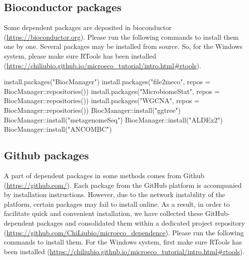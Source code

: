 \documentclass[
]{book}
\newenvironment{Shaded}{\begin{snugshade}}{\end{snugshade}}
\newcommand{\AttributeTok}[1]{\textcolor[rgb]{0.77,0.63,0.00}{#1}}
\newcommand{\FunctionTok}[1]{\textcolor[rgb]{0.00,0.00,0.00}{#1}}
\newcommand{\NormalTok}[1]{#1}
\newcommand{\SpecialCharTok}[1]{\textcolor[rgb]{0.00,0.00,0.00}{#1}}
\newcommand{\StringTok}[1]{\textcolor[rgb]{0.31,0.60,0.02}{#1}}
\begin{document}
\hypertarget{bioconductor-packages}{%
\subsection{Bioconductor packages}\label{bioconductor-packages}}

Some dependent packages are deposited in bioconductor (\url{https://bioconductor.org}).
Please run the following commands to install them one by one.
Several packages may be installed from source.
So, for the Windows system, please make sure RTools has been installed (\url{https://chiliubio.github.io/microeco_tutorial/intro.html\#rtools}).

\begin{Shaded}
\begin{Highlighting}[]
\FunctionTok{install.packages}\NormalTok{(}\StringTok{"BiocManager"}\NormalTok{)}
\FunctionTok{install.packages}\NormalTok{(}\StringTok{"file2meco"}\NormalTok{, }\AttributeTok{repos =}\NormalTok{ BiocManager}\SpecialCharTok{::}\FunctionTok{repositories}\NormalTok{())}
\FunctionTok{install.packages}\NormalTok{(}\StringTok{"MicrobiomeStat"}\NormalTok{, }\AttributeTok{repos =}\NormalTok{ BiocManager}\SpecialCharTok{::}\FunctionTok{repositories}\NormalTok{())}
\FunctionTok{install.packages}\NormalTok{(}\StringTok{"WGCNA"}\NormalTok{, }\AttributeTok{repos =}\NormalTok{ BiocManager}\SpecialCharTok{::}\FunctionTok{repositories}\NormalTok{())}
\NormalTok{BiocManager}\SpecialCharTok{::}\FunctionTok{install}\NormalTok{(}\StringTok{"ggtree"}\NormalTok{)}
\NormalTok{BiocManager}\SpecialCharTok{::}\FunctionTok{install}\NormalTok{(}\StringTok{"metagenomeSeq"}\NormalTok{)}
\NormalTok{BiocManager}\SpecialCharTok{::}\FunctionTok{install}\NormalTok{(}\StringTok{"ALDEx2"}\NormalTok{)}
\NormalTok{BiocManager}\SpecialCharTok{::}\FunctionTok{install}\NormalTok{(}\StringTok{"ANCOMBC"}\NormalTok{)}
\end{Highlighting}
\end{Shaded}

\hypertarget{github-packages}{%
\subsection{Github packages}\label{github-packages}}

A part of dependent packages in some methods comes from Github (\url{https://github.com/}).
Each package from the GitHub platform is accompanied by installation instructions.
However, due to the network instability of the platform, certain packages may fail to install online.
As a result, in order to facilitate quick and convenient installation,
we have collected these GitHub-dependent packages and consolidated them within a dedicated project repository (\url{https://github.com/ChiLiubio/microeco_dependence}).
Please run the following commands to install them.
For the Windows system, first make sure RTools has been installed (\url{https://chiliubio.github.io/microeco_tutorial/intro.html\#rtools}).
\end{document}
